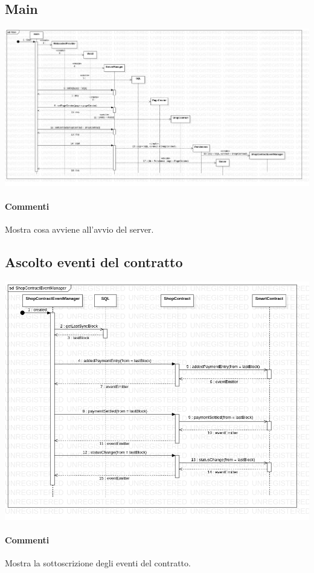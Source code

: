 \documentclass[a4paper, 12pt]{article}
\begin{document}
\subsection{Main}
\includegraphics[width=1.0\textwidth]{main}
\paragraph{Commenti}
Mostra cosa avviene all'avvio del server.

\subsection{Ascolto eventi del contratto}
\includegraphics[width=1.0\textwidth]{shopContractEventManager}
\paragraph{Commenti}
Mostra la sottoscrizione degli eventi del contratto.
\end{document}
